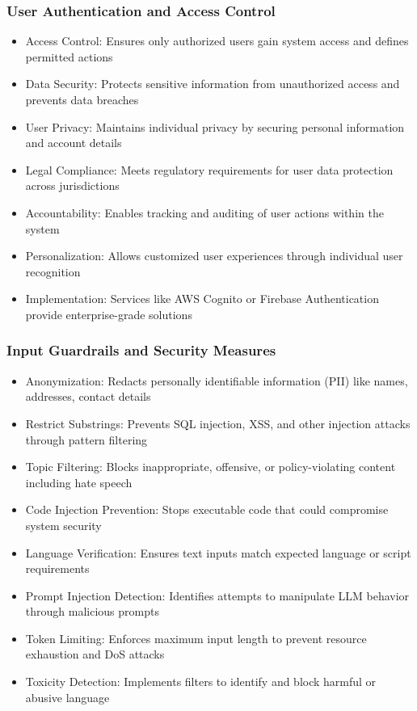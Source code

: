 \begin{frame}[fragile]\frametitle{User Authentication and Access Control}

 \begin{itemize}
        \item Access Control: Ensures only authorized users gain system access and defines permitted actions
        \item Data Security: Protects sensitive information from unauthorized access and prevents data breaches
        \item User Privacy: Maintains individual privacy by securing personal information and account details
        \item Legal Compliance: Meets regulatory requirements for user data protection across jurisdictions
        \item Accountability: Enables tracking and auditing of user actions within the system
        \item Personalization: Allows customized user experiences through individual user recognition
        \item Implementation: Services like AWS Cognito or Firebase Authentication provide enterprise-grade solutions
      \end{itemize}
\end{frame}

\begin{frame}[fragile]\frametitle{Input Guardrails and Security Measures}


      \begin{itemize}
        \item Anonymization: Redacts personally identifiable information (PII) like names, addresses, contact details
        \item Restrict Substrings: Prevents SQL injection, XSS, and other injection attacks through pattern filtering
        \item Topic Filtering: Blocks inappropriate, offensive, or policy-violating content including hate speech
        \item Code Injection Prevention: Stops executable code that could compromise system security
        \item Language Verification: Ensures text inputs match expected language or script requirements
        \item Prompt Injection Detection: Identifies attempts to manipulate LLM behavior through malicious prompts
        \item Token Limiting: Enforces maximum input length to prevent resource exhaustion and DoS attacks
        \item Toxicity Detection: Implements filters to identify and block harmful or abusive language
      \end{itemize}
\end{frame}


